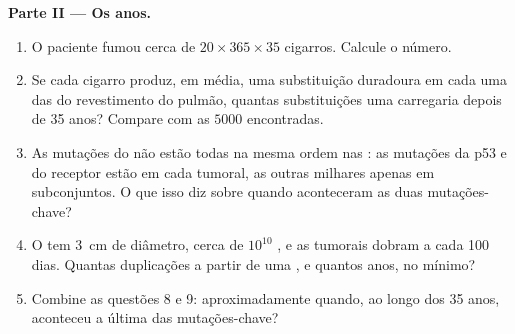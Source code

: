 \begin{problem}
\medskip
\noindent\textbf{Parte II --- Os anos.}
\begin{enumerate}[resume]
  \item O paciente fumou cerca de $20 \times 365 \times 35$ cigarros.
        Calcule o número.
  \item Se cada cigarro produz, em média, uma substituição duradoura
        em cada uma das  do revestimento do pulmão, quantas
        substituições uma  carregaria depois de 35 anos? Compare
        com as $\num{5000}$ encontradas.
  \item As mutações do  não estão todas na mesma ordem nas
        : as mutações da p53 e do receptor estão em cada 
        tumoral, as outras milhares apenas em subconjuntos. O que isso
        diz sobre quando aconteceram as duas mutações-chave?
  \item O  tem \qty{3}{cm} de diâmetro, cerca de $10^{10}$
        , e as  tumorais dobram a cada 100 dias. Quantas
        duplicações a partir de uma , e quantos anos, no mínimo?
  \item Combine as questões 8 e 9: aproximadamente quando, ao longo
        dos 35 anos, aconteceu a última das mutações-chave?
\end{enumerate}


\end{problem}
